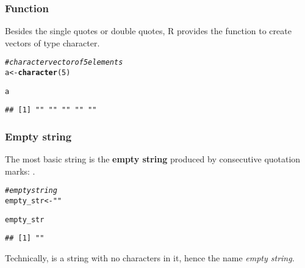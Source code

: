 \documentclass[12pt]{beamer}\usepackage[]{graphicx}\usepackage[]{color}
\makeatletter
\newcommand{\hlnum}[1]{\textcolor[rgb]{0.686,0.059,0.569}{#1}}%
\newcommand{\hlstr}[1]{\textcolor[rgb]{0.192,0.494,0.8}{#1}}%
\newcommand{\hlcom}[1]{\textcolor[rgb]{0.678,0.584,0.686}{\textit{#1}}}%
\newcommand{\hlstd}[1]{\textcolor[rgb]{0.345,0.345,0.345}{#1}}%
\newcommand{\hlkwb}[1]{\textcolor[rgb]{0.69,0.353,0.396}{#1}}%
\newcommand{\hlkwd}[1]{\textcolor[rgb]{0.737,0.353,0.396}{\textbf{#1}}}%
\newenvironment{kframe}{%
 \def\at@end@of@kframe{}%
 \ifinner\ifhmode%
  \def\at@end@of@kframe{\end{minipage}}%
  \begin{minipage}{\columnwidth}%
 \fi\fi%
 \def\FrameCommand##1{\hskip\@totalleftmargin \hskip-\fboxsep
 \colorbox{shadecolor}{##1}\hskip-\fboxsep
     \hskip-\linewidth \hskip-\@totalleftmargin \hskip\columnwidth}%
 \MakeFramed {\advance\hsize-\width
   \@totalleftmargin\z@ \linewidth\hsize
   \@setminipage}}%
 {\par\unskip\endMakeFramed%
 \at@end@of@kframe}
\newenvironment{knitrout}{}{} %
\makeatother
\begin{document}

\begin{frame}[fragile]
\frametitle{Function }

Besides the single quotes or double quotes, R provides the function  to create vectors of type character. 

\begin{knitrout}\footnotesize
{}\color{fgcolor}\begin{kframe}
\begin{alltt}
\hlcom{# character vector of 5 elements}
\hlstd{a} \hlkwb{<-} \hlkwd{character}\hlstd{(}\hlnum{5}\hlstd{)}

\hlstd{a}
\end{alltt}
\begin{verbatim}
## [1] "" "" "" "" ""
\end{verbatim}
\end{kframe}
\end{knitrout}

\end{frame}


\begin{frame}[fragile]
\frametitle{Empty string}

The most basic string is the \textbf{empty string} produced by consecutive quotation marks: . 
\begin{knitrout}\footnotesize
{}\color{fgcolor}\begin{kframe}
\begin{alltt}
\hlcom{# empty string}
\hlstd{empty_str} \hlkwb{<-} \hlstr{""}

\hlstd{empty_str}
\end{alltt}
\begin{verbatim}
## [1] ""
\end{verbatim}
\end{kframe}
\end{knitrout}
Technically,  is a string with no characters in it, hence the name \textit{empty string}.

\end{frame}

\end{document}
